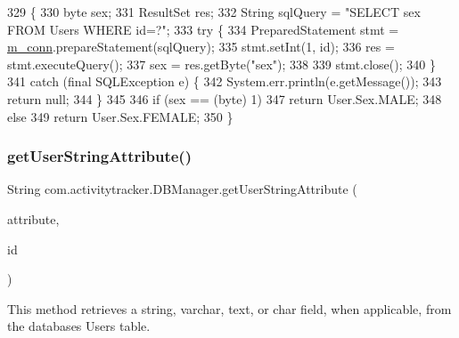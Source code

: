 \begin{DoxyCode}
329                                              \{
330         byte sex;
331         ResultSet res;
332         String sqlQuery = \textcolor{stringliteral}{"SELECT sex FROM Users WHERE id=?"};
333         \textcolor{keywordflow}{try} \{
334             PreparedStatement stmt = \mbox{\hyperlink{classcom_1_1activitytracker_1_1_d_b_manager_a064088d13ac09eb147fdc19268771521}{m\_conn}}.prepareStatement(sqlQuery);
335             stmt.setInt(1, \textcolor{keywordtype}{id});
336             res = stmt.executeQuery();
337             sex = res.getByte(\textcolor{stringliteral}{"sex"});
338 
339             stmt.close();
340         \}
341         \textcolor{keywordflow}{catch} (\textcolor{keyword}{final} SQLException e) \{
342             System.err.println(e.getMessage());
343             \textcolor{keywordflow}{return} null;
344         \}
345 
346         \textcolor{keywordflow}{if} (sex == (byte) 1)
347             \textcolor{keywordflow}{return} User.Sex.MALE;
348         \textcolor{keywordflow}{else}
349             \textcolor{keywordflow}{return} User.Sex.FEMALE;
350     \}
\end{DoxyCode}
\mbox{\label{classcom_1_1activitytracker_1_1_d_b_manager_a20f726c054d6c8a6fc3ce629d87f1114}} 
\subsubsection{\texorpdfstring{get\+User\+String\+Attribute()}{getUserStringAttribute()}}
{\footnotesize\ttfamily String com.\+activitytracker.\+D\+B\+Manager.\+get\+User\+String\+Attribute (\begin{DoxyParamCaption}\item[{final \mbox{\hyperlink{enumcom_1_1activitytracker_1_1_user_attribute}{User\+Attribute}}}]{attribute,  }\item[{final int}]{id }\end{DoxyParamCaption})}

This method retrieves a string, varchar, text, or char field, when applicable, from the database\textquotesingle{}s Users table.

